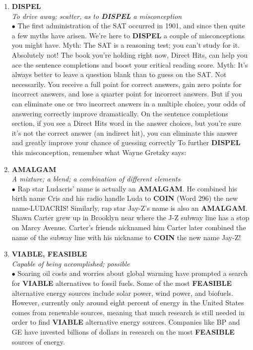 \documentclass{book}
\begin{document}
\begin{enumerate}
\item \textbf{DISPEL}\\
\textit{ To drive away; scatter, as to \textbf{DISPEL} a misconception}\\

$\bullet$ The first administration of the SAT occurred in 1901, and since then quite a few myths have arisen. We're here to \textbf{DISPEL} a couple of misconceptions you might have. Myth: The SAT is a reasoning test; you can't study for it. Absolutely not! The book you're holding right now, Direct Hits, can help you ace the sentence completions and boost your critical reading score. Myth: It's always better to leave a question blank than to guess on the SAT. Not necessarily. You receive a full point for correct answers, gain zero points for incorrect answers, and lose a quarter point for incorrect answers. But if you can eliminate one or two incorrect answers in a multiple choice, your odds of answering correctly improve dramatically. On the sentence completions section, if you see a Direct Hits word in the answer choices, but you're sure it's not the correct answer (an indirect hit), you can eliminate this answer and greatly improve your chance of guessing correctly To further \textbf{DISPEL} this misconception, remember what Wayne Gretzky says:  

\item \textbf{AMALGAM}\\
\textit{ A mixture; a blend; a combination of different elements}\\

$\bullet$ Rap star Ludacris' name is actually an \textbf{AMALGAM}. He combined his birth name Cris and his radio handle Luda to \textbf{COIN} (Word 296) the new name-LUDACRIS! Similarly, rap star Jay-Z's name is also an \textbf{AMALGAM}. Shawn Carter grew up in Brooklyn near where the J-Z subway line has a stop on Marcy Avenue. Carter's friends nicknamed him  Carter later combined the name of the subway line with his nickname to \textbf{COIN} the new name Jay-Z! 

\item \textbf{VIABLE, FEASIBLE}\\
\textit{ Capable of being accomplished; possible}\\

$\bullet$ Soaring oil costs and worries about global warming have prompted a search for \textbf{VIABLE} alternatives to fossil fuels. Some of the most \textbf{FEASIBLE} alternative energy sources include solar power, wind power, and biofuels. However, currently only around eight percent of energy in the United States comes from renewable sources, meaning that much research is still needed in order to find \textbf{VIABLE} alternative energy sources. Companies like BP and GE have invested billions of dollars in research on the most \textbf{FEASIBLE} sources of energy. 


\end{enumerate}
\end{document}
